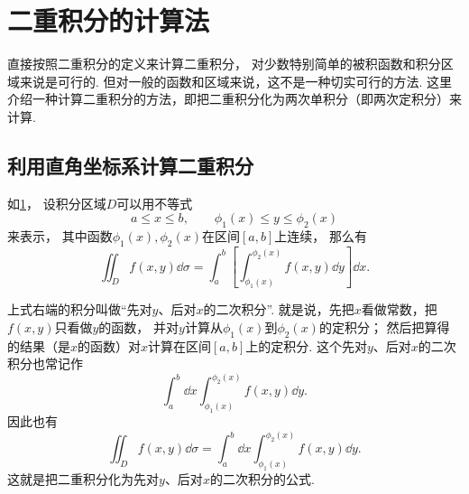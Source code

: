 \section{二重积分的计算法}
直接按照二重积分的定义来计算二重积分，
对少数特别简单的被积函数和积分区域来说是可行的.
但对一般的函数和区域来说，这不是一种切实可行的方法.
这里介绍一种计算二重积分的方法，即把二重积分化为两次单积分（即两次定积分）来计算.

\subsection{利用直角坐标系计算二重积分}
如\cref{figure:二重积分.X型区域}，
设积分区域\(D\)可以用不等式
\begin{equation*}
	a \leq x \leq b, \qquad
	\phi_1(x) \leq y \leq \phi_2(x)
\end{equation*}来表示，
其中函数\(\phi_1(x),\phi_2(x)\)在区间\([a,b]\)上连续，
那么有\begin{equation*}
	\iint_D f(x,y) \dd{\sigma}
	= \int_a^b \left[ \int_{\phi_1(x)}^{\phi_2(x)} f(x,y) \dd{y} \right] \dd{x}.
\end{equation*}

上式右端的积分叫做“先对\(y\)、后对\(x\)的二次积分”.
就是说，先把\(x\)看做常数，把\(f(x,y)\)只看做\(y\)的函数，
并对\(y\)计算从\(\phi_1(x)\)到\(\phi_2(x)\)的定积分；
然后把算得的结果（是\(x\)的函数）对\(x\)计算在区间\([a,b]\)上的定积分.
这个先对\(y\)、后对\(x\)的二次积分也常记作\begin{equation*}
	\int_a^b \dd{x} \int_{\phi_1(x)}^{\phi_2(x)} f(x,y) \dd{y}.
\end{equation*}
因此也有\begin{equation*}
	\iint_D f(x,y) \dd{\sigma}
	= \int_a^b \dd{x} \int_{\phi_1(x)}^{\phi_2(x)} f(x,y) \dd{y}.
\end{equation*}
这就是把二重积分化为先对\(y\)、后对\(x\)的二次积分的公式.

\begin{figure}[htb]
	\centering
	\caption{}
	\label{figure:二重积分.X型区域}
\end{figure}

